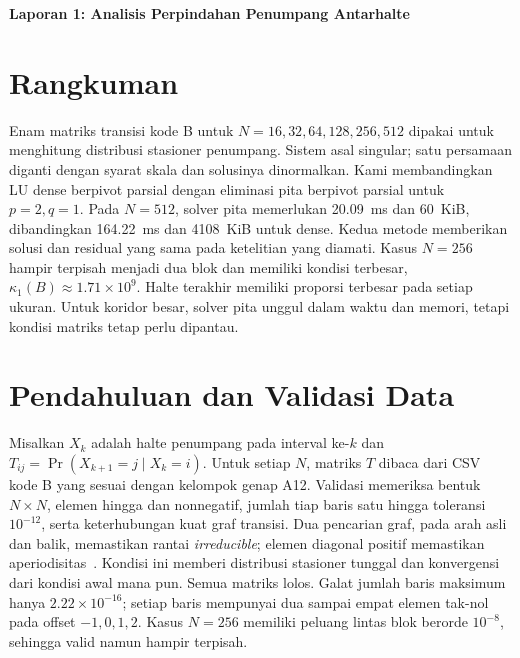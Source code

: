 \begin{center}{\large\bfseries Laporan 1: Analisis Perpindahan Penumpang Antarhalte}\end{center}
\section*{Rangkuman}
Enam matriks transisi kode B untuk $N=16,32,64,128,256,512$ dipakai untuk menghitung distribusi stasioner penumpang. Sistem asal singular; satu persamaan diganti dengan syarat skala dan solusinya dinormalkan. Kami membandingkan LU dense berpivot parsial dengan eliminasi pita berpivot parsial untuk $p=2,q=1$. Pada $N=512$, solver pita memerlukan 20.09~ms dan 60~KiB, dibandingkan 164.22~ms dan 4108~KiB untuk dense. Kedua metode memberikan solusi dan residual yang sama pada ketelitian yang diamati. Kasus $N=256$ hampir terpisah menjadi dua blok dan memiliki kondisi terbesar, $\kappa_1(B)\approx1.71\times10^9$. Halte terakhir memiliki proporsi terbesar pada setiap ukuran. Untuk koridor besar, solver pita unggul dalam waktu dan memori, tetapi kondisi matriks tetap perlu dipantau.

\section{Pendahuluan dan Validasi Data}
Misalkan $X_k$ adalah halte penumpang pada interval ke-$k$ dan $T_{ij}=\Pr(X_{k+1}=j\mid X_k=i)$. Untuk setiap $N$, matriks $T$ dibaca dari CSV kode B yang sesuai dengan kelompok genap A12. Validasi memeriksa bentuk $N\times N$, elemen hingga dan nonnegatif, jumlah tiap baris satu hingga toleransi $10^{-12}$, serta keterhubungan kuat graf transisi. Dua pencarian graf, pada arah asli dan balik, memastikan rantai \emph{irreducible}; elemen diagonal positif memastikan aperiodisitas~\cite{norris}. Kondisi ini memberi distribusi stasioner tunggal dan konvergensi dari kondisi awal mana pun. Semua matriks lolos. Galat jumlah baris maksimum hanya $2.22\times10^{-16}$; setiap baris mempunyai dua sampai empat elemen tak-nol pada offset $-1,0,1,2$. Kasus $N=256$ memiliki peluang lintas blok berorde $10^{-8}$, sehingga valid namun hampir terpisah.


